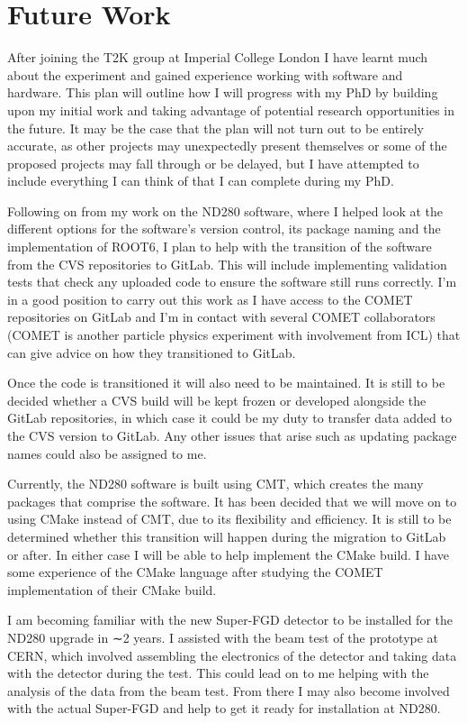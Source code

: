 \documentclass[aps,pra,12pt,notitlepage,tightenlines]{revtex4-1}
\begin{document}
\section{Future Work}
After joining the T2K group at Imperial College London I have learnt much about the experiment and gained experience working with software and hardware. This plan will outline how I will progress with my PhD by building upon my initial work and taking advantage of potential research opportunities in the future. It may be the case that the plan will not turn out to be entirely accurate, as other projects may unexpectedly present themselves or some of the proposed projects may fall through or be delayed, but I have attempted to include everything I can think of that I can complete during my PhD.

Following on from my work on the ND280 software, where I helped look at the different options for the software’s version control, its package naming and the implementation of ROOT6, I plan to help with the transition of the software from the CVS repositories to GitLab. This will include implementing validation tests that check any uploaded code to ensure the software still runs correctly. I’m in a good position to carry out this work as I have access to the COMET repositories on GitLab and I’m in contact with several COMET collaborators (COMET is another particle physics experiment with involvement from ICL) that can give advice on how they transitioned to GitLab.

Once the code is transitioned it will also need to be maintained. It is still to be decided whether a CVS build will be kept frozen or developed alongside the GitLab repositories, in which case it could be my duty to transfer data added to the CVS version to GitLab. Any other issues that arise such as updating package names could also be assigned to me.

Currently, the ND280 software is built using CMT, which creates the many packages that comprise the software. It has been decided that we will move on to using CMake instead of CMT, due to its flexibility and efficiency. It is still to be determined whether this transition will happen during the migration to GitLab or after. In either case I will be able to help implement the CMake build. I have some experience of the CMake language after studying the COMET implementation of their CMake build.

I am becoming familiar with the new Super-FGD detector to be installed for the ND280 upgrade in ∼2 years. I assisted with the beam test of the prototype at CERN, which involved assembling the electronics of the detector and taking data with the detector during the test. This could lead on to me helping with the analysis of the data from the beam test. From there I may also become involved with the actual Super-FGD and help to get it ready for installation at ND280.
\end{document}
